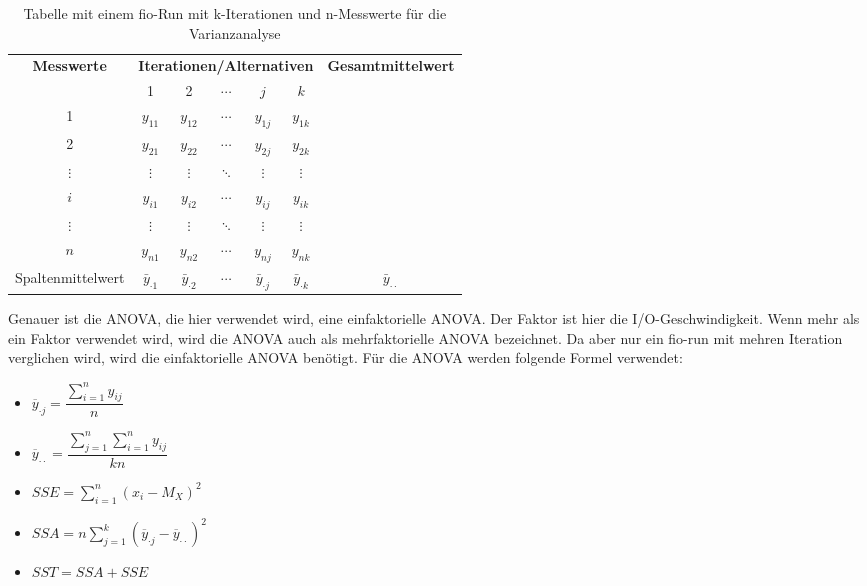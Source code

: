 \begin{table}[h!]
  \centering
  \begin{tabular}{|c|*{5}{c}|c|}
  \hline
  \textbf{Messwerte} & \multicolumn{5}{c|}{\textbf{Iterationen/Alternativen}} & \textbf{Gesamtmittelwert} \\
  \cline{2-6}
   & 1 & 2 & $\cdots$ & $j$ & $k$ & \\
  \hline
  1 & $y_{11}$ & $y_{12}$ & $\cdots$ & $y_{1j}$ & $y_{1k}$ & \\
  2 & $y_{21}$ & $y_{22}$ & $\cdots$ & $y_{2j}$ & $y_{2k}$ & \\
  $\vdots$ & $\vdots$ & $\vdots$ & $\ddots$ & $\vdots$ & $\vdots$ & \\
  $i$ & $y_{i1}$ & $y_{i2}$ & $\cdots$ & $y_{ij}$ & $y_{ik}$ & \\
  $\vdots$ & $\vdots$ & $\vdots$ & $\ddots$ & $\vdots$ & $\vdots$ & \\
  $n$ & $y_{n1}$ & $y_{n2}$ & $\cdots$ & $y_{nj}$ & $y_{nk}$ &  \\
  \hline
  Spaltenmittelwert & $\bar{y}_{\cdot1}$ & $\bar{y}_{\cdot2}$ & $\cdots$ & $\bar{y}_{\cdot j}$ & $\bar{y}_{\cdot k}$ & $\bar{y}_{\cdot \cdot}$ \\
  \hline
  \end{tabular}
  \caption{Tabelle mit einem fio-Run mit k-Iterationen und n-Messwerte für die Varianzanalyse}
  \label{tab:measurements}
\end{table}

Genauer ist die ANOVA, die hier verwendet wird, eine einfaktorielle ANOVA.
Der Faktor ist hier die I/O-Geschwindigkeit. Wenn mehr als ein Faktor verwendet wird, wird die ANOVA auch als mehrfaktorielle ANOVA bezeichnet.
Da aber nur ein fio-run mit mehren Iteration verglichen wird, wird die einfaktorielle ANOVA benötigt.
Für die ANOVA werden folgende Formel verwendet:

\begin{itemize}
  \item $\overline{y}_{\cdot j} = \dfrac{\sum_{i=1}^{n} y_{ij}}{n}$
  \item $\overline{y}_{\cdot \cdot} = \dfrac{\sum_{j=1}^{n} \sum_{i=1}^{n} y_{ij}}{kn}$
  \item $SSE =  \sum_{i=1}^{n} (x_i - M_X)^2$
  \item $SSA = n \sum_{j=1}^{k} (\overline{y}_{\cdot j} - \overline{y}_{\cdot \cdot})^2$
  \item $SST = SSA + SSE$
\end{itemize}


